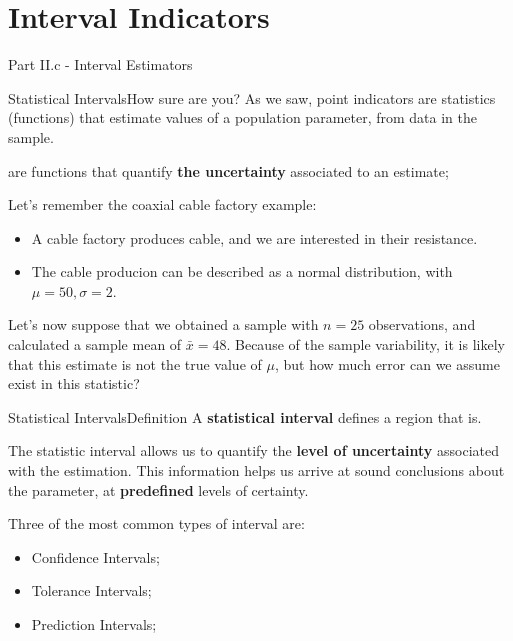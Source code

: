 \section{Interval Indicators}
\begin{frame}
  \begin{center}
    Part II.c - Interval Estimators
  \end{center}
\end{frame}

\begin{frame}{Statistical Intervals}{How sure are you?}
As we saw, point indicators are statistics (functions) that estimate values of a population parameter, from data in the sample.\bigskip

 are functions that quantify {\bf the uncertainty} associated to an estimate;
\bigskip

Let's remember the coaxial cable factory example:
\begin{itemize}
  \item A cable factory produces cable, and we are interested in their resistance.
  \item The cable producion can be described as a normal distribution, with $\mu = 50, \sigma = 2$.
\end{itemize}\bigskip

Let's now suppose that we obtained a sample with $n=25$ observations, and calculated a sample mean of $\bar{x} = 48$. Because of the sample variability, it is likely that this estimate is not the true value of $\mu$, but how much error can we assume exist in this statistic?
\end{frame}

\begin{frame}{Statistical Intervals}{Definition}
A {\bf statistical interval} defines a region that is.
\bigskip

The statistic interval allows us to quantify the {\bf level of uncertainty} associated with the estimation. This information helps us arrive at sound conclusions about the parameter, at {\bf predefined} levels of certainty.
\bigskip

Three of the most common types of interval are:

\begin{itemize}
  \item Confidence Intervals;
  \item Tolerance Intervals;
  \item Prediction Intervals;
\end{itemize}
\end{frame}


